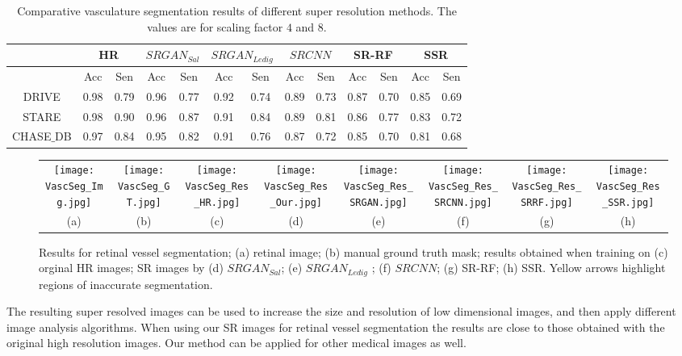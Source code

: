 \documentclass{llncs}
\begin{document}
\begin{table}[t]
\begin{tabular}{|c|c|c|c|c|c|c|c|c|c|c|c|c|}
\hline{} & \multicolumn{2}{|c|}{HR} & \multicolumn{2}{|c|}{$SRGAN_{Sal}$} & \multicolumn{2}{|c|}{$SRGAN_{Ledig}$} & \multicolumn{2}{|c|}{$SRCNN$} & \multicolumn{2}{|c|}{SR-RF} & \multicolumn{2}{|c|}{SSR} \\  \hline{} & {Acc} & {Sen}  & {Acc} & {Sen} &{Acc} & {Sen} & {Acc} & {Sen}  & {Acc} & {Sen} &{Acc} & {Sen} \\ \hline{DRIVE} & 0.98  & 0.79  & {0.96} & {0.77} & 0.92  & 0.74 & 0.89 & 0.73 & 0.87  & 0.70 & 0.85 & 0.69 \\  \hline{STARE} & 0.98  & 0.90  & 0.96 & 0.87 & 0.91  & 0.84  & 0.89 &  0.81 & 0.86  & 0.77  & 0.83 & 0.72 \\  \hline{CHASE$\_$DB} & 0.97 &  0.84  & 0.95 & 0.82  & 0.91  & 0.76  &  0.87 &  0.72& 0.85 &  0.70  & 0.81 & 0.68  \\  \hline
\end{tabular}
\caption{Comparative vasculature segmentation results of different super resolution methods. The values are for scaling factor $4$ and $8$.}
\label{tab:SrRes_vasc}
\end{table}\begin{figure*}[t]
\begin{tabular}{cccccccc}
\texttt{[image: VascSeg\_Img.jpg]} &
\texttt{[image: VascSeg\_GT.jpg]} &
\texttt{[image: VascSeg\_Res\_HR.jpg]} &
\texttt{[image: VascSeg\_Res\_Our.jpg]} &
\texttt{[image: VascSeg\_Res\_SRGAN.jpg]} &
\texttt{[image: VascSeg\_Res\_SRCNN.jpg]} &
\texttt{[image: VascSeg\_Res\_SRRF.jpg]} &
\texttt{[image: VascSeg\_Res\_SSR.jpg]} \\
(a) & (b) & (c) & (d) & (e) & (f) & (g) & (h) \\ 
\end{tabular}
\caption{Results for retinal vessel segmentation; (a) retinal image; (b) manual ground truth mask; results obtained when training on (c) orginal HR images; SR images by (d) $SRGAN_{Sal}$; (e) $SRGAN_{Ledig}$ ; (f) $SRCNN$; (g) SR-RF; (h) SSR. Yellow arrows highlight regions of inaccurate segmentation.}
\label{fig:res1}
\end{figure*}

The resulting super resolved images can be used to increase the size and resolution of low dimensional images, and then apply different image analysis algorithms. When using our SR images for retinal vessel segmentation the results are close to those obtained with the original high resolution images. Our method can be applied for other medical images as well.









\end{document}
